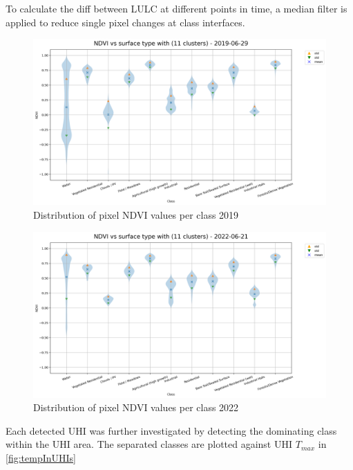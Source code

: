 \documentclass[12pt,a4paper, english,twoside]{scrartcl}
\begin{document}
      To calculate the diff between \gls{LULC} at different points in time, a median filter is applied to reduce single pixel changes at class interfaces. 
       \begin{landscape}
         \begin{figure}[!p]
           \centering
           \includegraphics[width=0.91\linewidth]{img/NDVI vs surface type with (11 clusters) - 2019-06-29.png}
           \caption{Distribution of pixel \gls{NDVI} values per class 2019\label{fig:ndviclusters2019}}
         \end{figure}

         \begin{figure}[!p]
           \centering
           \includegraphics[width=0.91\linewidth]{img/NDVI vs surface type with (11 clusters) - 2022-06-21.png}
           \caption{Distribution of pixel \gls{NDVI} values per class 2022\label{fig:ndviclusters2022}}
         \end{figure}
       \end{landscape}
      \noindent
      Each detected \gls{UHI} was further investigated by detecting the dominating class within the \gls{UHI} area. 
      The separated classes are plotted against \gls{UHI} $T_{max}$ in \cref{fig:tempInUHIs}
\end{document}
